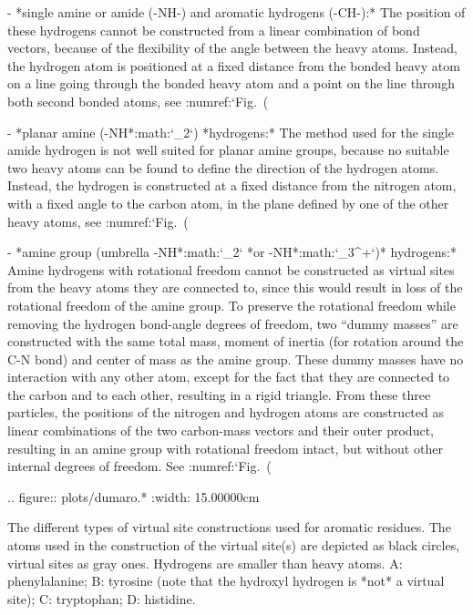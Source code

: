 -  *single amine or amide (-NH-) and aromatic hydrogens
   (-CH-):* 
   The position of these hydrogens cannot be
   constructed from a linear combination of bond vectors, because of the
   flexibility of the angle between the heavy atoms. Instead, the
   hydrogen atom is positioned at a fixed distance from the bonded heavy
   atom on a line going through the bonded heavy atom and a point on the
   line through both second bonded atoms, see
   :numref:`Fig. (%

-  *planar amine (-NH*:math:`_2`) *hydrogens:* The method
   used for the single amide hydrogen is not well suited for planar
   amine groups, because no suitable two heavy atoms can be found to
   define the direction of the hydrogen atoms. Instead, the hydrogen is
   constructed at a fixed distance from the nitrogen atom, with a fixed
   angle to the carbon atom, in the plane defined by one of the other
   heavy atoms, see :numref:`Fig. (%

-  *amine group (umbrella -NH*:math:`_2` *or
   -NH*:math:`_3^+`)* hydrogens:* Amine hydrogens with
   rotational freedom cannot be constructed as virtual sites from the
   heavy atoms they are connected to, since this would result in loss of
   the rotational freedom of the amine group. To preserve the rotational
   freedom while removing the hydrogen bond-angle degrees of freedom,
   two “dummy masses” are constructed with the same total mass, moment
   of inertia (for rotation around the C-N bond) and
   center of mass as the amine group. These dummy masses have no
   interaction with any other atom, except for the fact that they are
   connected to the carbon and to each other, resulting in a rigid
   triangle. From these three particles, the positions of the nitrogen
   and hydrogen atoms are constructed as linear combinations of the two
   carbon-mass vectors and their outer product, resulting in an amine
   group with rotational freedom intact, but without other internal
   degrees of freedom. See :numref:`Fig. (%

.. figure:: plots/dumaro.*
   :width: 15.00000cm

   The different types of virtual site constructions used for aromatic
   residues. The atoms used in the construction of the virtual site(s)
   are depicted as black circles, virtual sites as gray ones. Hydrogens
   are smaller than heavy atoms. A: phenylalanine;
   B: tyrosine (note that the hydroxyl hydrogen is *not*
   a virtual site); C: tryptophan; D:
   histidine.

